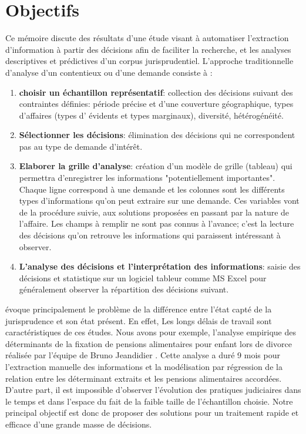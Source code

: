 \section{Objectifs}
 Ce mémoire discute des résultats d'une étude visant à automatiser l'extraction d'information à partir des décisions afin de faciliter la recherche, et les analyses descriptives et prédictives d'un corpus jurisprudentiel. L'approche traditionnelle d'analyse d'un contentieux ou d'une demande \citep{ancel2003expulsion} consiste à :
 \begin{enumerate}
 	\item \textbf{choisir un échantillon représentatif}: collection des décisions suivant des contraintes définies:  période précise et d'une couverture géographique, types d'affaires (types d' évidents et types marginaux), diversité, hétérogénéité. 
 	\item \textbf{Sélectionner les décisions}: élimination des décisions qui ne correspondent pas au type de demande d'intérêt.
 	\item \textbf{Elaborer la grille d'analyse}: création d'un modèle de grille (tableau) qui permettra d'enregistrer les informations "potentiellement importantes". Chaque ligne correspond à une demande et les colonnes sont les différents types d'informations qu'on peut extraire sur une demande. Ces variables vont de la procédure suivie, aux solutions proposées en passant par la nature de l'affaire. Les champs à remplir ne sont pas connus à l'avance; c'est la lecture des décisions qu'on retrouve les informations qui paraissent intéressant à observer.
 	\item \textbf{L'analyse des décisions et l'interprétation des informations}: saisie des décisions et statistique sur un logiciel tableur comme MS Excel pour généralement observer la répartition des décisions suivant.
 \end{enumerate}
 
\citet{ancel2003expulsion} évoque principalement le problème de la différence entre l'état capté de la jurisprudence et son état présent. En effet, Les longs délais de travail sont caractéristiques de ces études. Nous avons pour exemple, l'analyse empirique des déterminants de la fixation de pensions alimentaires pour enfant lors de divorce réalisée par l'équipe de Bruno Jeandidier \citep{jeandidier2006pensions}. Cette analyse a duré 9 mois pour l'extraction manuelle des informations et la modélisation par régression de la relation entre les déterminant extraits et les pensions alimentaires accordées.  D'autre part, il est impossible d'observer l'évolution des pratiques judiciaires dans le temps et dans l'espace du fait de la faible taille de l'échantillon choisie. Notre principal objectif est donc de proposer des solutions pour un traitement rapide et efficace d'une grande masse de décisions. 
 
